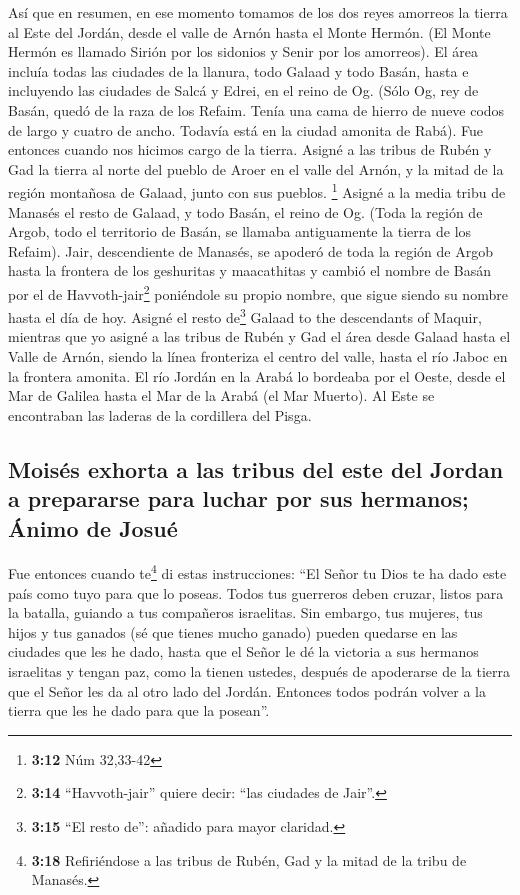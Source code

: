  Así que en resumen, en ese momento tomamos de los dos
reyes amorreos la tierra al Este del Jordán, desde el valle de Arnón
hasta el Monte Hermón.  (El Monte Hermón es llamado Sirión
por los sidonios y Senir por los amorreos).  El área
incluía todas las ciudades de la llanura, todo Galaad y todo Basán,
hasta e incluyendo las ciudades de Salcá y Edrei, en el reino de Og.
 (Sólo Og, rey de Basán, quedó de la raza de los Refaim.
Tenía una cama de hierro de nueve codos de largo y cuatro de ancho.
Todavía está en la ciudad amonita de Rabá).  Fue entonces
cuando nos hicimos cargo de la tierra. Asigné a las tribus de Rubén y
Gad la tierra al norte del pueblo de Aroer en el valle del Arnón, y la
mitad de la región montañosa de Galaad, junto con sus pueblos.
\footnote{\textbf{3:12} Núm 32,33-42}  Asigné a la media
tribu de Manasés el resto de Galaad, y todo Basán, el reino de Og. (Toda
la región de Argob, todo el territorio de Basán, se llamaba antiguamente
la tierra de los Refaim).  Jair, descendiente de Manasés,
se apoderó de toda la región de Argob hasta la frontera de los
geshuritas y maacathitas y cambió el nombre de Basán por el de
Havvoth-jair\footnote{\textbf{3:14} ``Havvoth-jair'' quiere decir: ``las
  ciudades de Jair''.} poniéndole su propio nombre, que sigue siendo su
nombre hasta el día de hoy.  Asigné el resto
de\footnote{\textbf{3:15} ``El resto de'': añadido para mayor claridad.}
Galaad to the descendants of Maquir,  mientras que yo
asigné a las tribus de Rubén y Gad el área desde Galaad hasta el Valle
de Arnón, siendo la línea fronteriza el centro del valle, hasta el río
Jaboc en la frontera amonita.  El río Jordán en la Arabá
lo bordeaba por el Oeste, desde el Mar de Galilea hasta el Mar de la
Arabá (el Mar Muerto). Al Este se encontraban las laderas de la
cordillera del Pisga.

\hypertarget{moisuxe9s-exhorta-a-las-tribus-del-este-del-jordan-a-prepararse-para-luchar-por-sus-hermanos-uxe1nimo-de-josuuxe9}{%
\subsection{Moisés exhorta a las tribus del este del Jordan a prepararse
para luchar por sus hermanos; Ánimo de
Josué}\label{moisuxe9s-exhorta-a-las-tribus-del-este-del-jordan-a-prepararse-para-luchar-por-sus-hermanos-uxe1nimo-de-josuuxe9}}

 Fue entonces cuando te\footnote{\textbf{3:18}
  Refiriéndose a las tribus de Rubén, Gad y la mitad de la tribu de
  Manasés.} di estas instrucciones: ``El Señor tu Dios te ha dado este
país como tuyo para que lo poseas. Todos tus guerreros deben cruzar,
listos para la batalla, guiando a tus compañeros israelitas.
 Sin embargo, tus mujeres, tus hijos y tus ganados (sé
que tienes mucho ganado) pueden quedarse en las ciudades que les he
dado,  hasta que el Señor le dé la victoria a sus
hermanos israelitas y tengan paz, como la tienen ustedes, después de
apoderarse de la tierra que el Señor les da al otro lado del Jordán.
Entonces todos podrán volver a la tierra que les he dado para que la
posean''.

